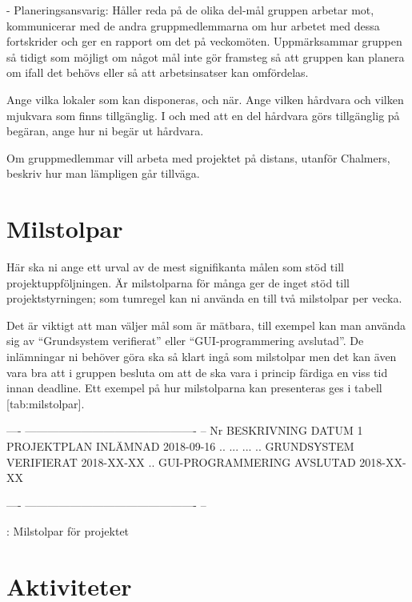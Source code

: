 \documentclass[a4paper]{article}
\begin{document}
-   Planeringsansvarig: Håller reda på de olika del-mål gruppen arbetar
    mot, kommunicerar med de andra gruppmedlemmarna om hur arbetet med
    dessa fortskrider och ger en rapport om det på veckomöten.
    Uppmärksammar gruppen så tidigt som möjligt om något mål inte gör
    framsteg så att gruppen kan planera om ifall det behövs eller så att
    arbetsinsatser kan omfördelas.

Ange vilka lokaler som kan disponeras, och när. Ange vilken hårdvara och
vilken mjukvara som finns tillgänglig. I och med att en del hårdvara
görs tillgänglig på begäran, ange hur ni begär ut hårdvara.

Om gruppmedlemmar vill arbeta med projektet på distans, utanför
Chalmers, beskriv hur man lämpligen går tillväga.



\section{Milstolpar}


Här ska ni ange ett urval av de mest signifikanta målen som stöd till
projektuppföljningen. Är milstolparna för många ger de inget stöd till
projektstyrningen; som tumregel kan ni använda en till två milstolpar
per vecka.

Det är viktigt att man väljer mål som är mätbara, till exempel kan man
använda sig av “Grundsystem verifierat” eller “GUI-programmering
avslutad”. De inlämningar ni behöver göra ska så klart ingå som
milstolpar men det kan även vara bra att i gruppen besluta om att de ska
vara i princip färdiga en viss tid innan deadline. Ett exempel på hur
milstolparna kan presenteras ges i tabell [tab:milstolpar].

  ---- ---------------------------------------------- --
  Nr   BESKRIVNING  DATUM                            
       1  PROJEKTPLAN INLÄMNAD  2018-09-16          
       ..  ...  ...                                 
       ..  GRUNDSYSTEM VERIFIERAT  2018-XX-XX       
       ..  GUI-PROGRAMMERING AVSLUTAD  2018-XX-XX   
                                                      
  ---- ---------------------------------------------- --

  : Milstolpar för projektet



\section{Aktiviteter}
\end{document}
